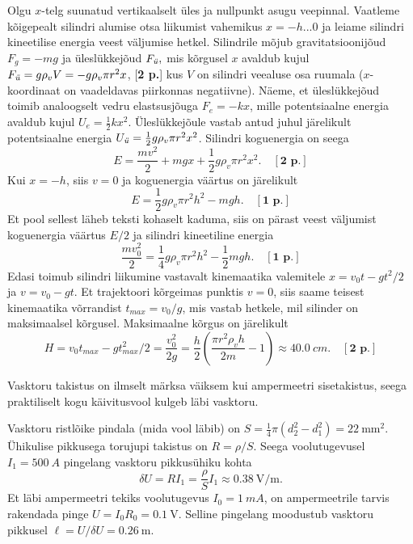\documentclass[10pt]{article}
\begin{document}
Olgu $x$-telg suunatud vertikaalselt üles ja nullpunkt asugu veepinnal. Vaatleme kõige\-pealt silindri alumise otsa liikumist vahemikus $x=-h...0$ ja leiame silindri kineetilise energia veest väljumise hetkel. Silindrile mõjub
gravitatsioonijõud ${F_g=-mg}$ ja üleslükkejõud $F_\text{\emph{\"u}},$ mis kõrgusel $x$ avaldub kujul $F_\text{\emph{\"u}}=g\rho_vV=-g\rho_v \pi r^2 x$, [\textbf{2 p.}] kus $V$ on silindri veealuse osa ruumala ($x$-koordinaat on vaadeldavas piirkonnas negatiiv\-ne). Näeme, et üleslükkejõud toimib analoogselt vedru elastsusjõuga $F_e=-kx$, mille potentsiaalne energia avaldub kujul $U_e=\frac{1}{2}kx^2$. Üleslükkejõule vastab antud juhul järelikult potentsiaalne energia $U_\text{\emph{\"u}}=\frac{1}{2}g\rho_v \pi r^2 x^2$. Silindri koguenergia on seega
\[
	E=\frac{mv^2}{2}+mgx+\frac{1}{2}g\rho_v \pi r^2 x^2. \quad[\textbf{2 p.}]
\]
Kui $x=-h$, siis $v=0$ ja koguenergia väärtus on järelikult
\[
	E=\frac{1}{2}g\rho_v \pi r^2 h^2-mgh. \quad[\textbf{1 p.}]
\]
Et pool sellest läheb teksti kohaselt kaduma, siis on pärast veest väljumist koguenergia väärtus $E/2$ ja silindri kineetiline energia
\[
	\frac{mv_0^2}{2}=\frac{1}{4}g\rho_v \pi r^2 h^2-\frac{1}{2}mgh. \quad[\textbf{1 p.}]
\]
Edasi toimub silindri liikumine vastavalt kinemaatika valemitele $x=v_0t-gt^2/2$ ja $v=v_0-gt$. Et trajektoori kõrgeimas punktis $v=0$, siis saame teisest kinemaatika võrrandist $t_{max}=v_0/g$, mis vastab hetkele, mil silinder on maksimaalsel kõrgusel. Maksimaalne kõrgus on järelikult
\[
	H=v_0t_{max}-gt_{max}^2/2=\frac{v_0^2}{2g}=\frac{h}{2}\left(\frac{\pi r^2\rho_v h}{2m}-1\right)\approx \SI{40.0}{cm}. \quad[\textbf{2 p.}]
\]
\probend
\bigskip

\setAuthor{}

\solu
Vasktoru takistus on ilmselt märksa väiksem kui ampermeetri sisetakistus, seega praktiliselt kogu käivitusvool kulgeb läbi vasktoru.

Vasktoru ristlõike pindala (mida vool läbib) on $S=\frac{1}{4}\pi(d_2^2-d_1^2)=\SI{22}{\milli\meter\squared}$. Ühikulise pikkusega torujupi takistus on $R=\rho/S$. Seega voolutugevusel $I_1=\SI{500}{A}$ pingelang vasktoru pikkusühiku kohta
\[
\delta U = RI_1 = \frac{\rho}{S}I_1\approx \SI{0.38}{\volt\per\meter}.
\]
Et läbi ampermeetri tekiks voolutugevus $I_0=\SI{1}{mA}$, on ampermeetrile tarvis rakendada pinge $U=I_0R_0=\SI{0.1}{\volt}$. Selline pingelang moodustub vasktoru pikkusel $\ell=U/\delta U=\SI{0.26}{\meter}$.
\probend
\bigskip
\end{document}
